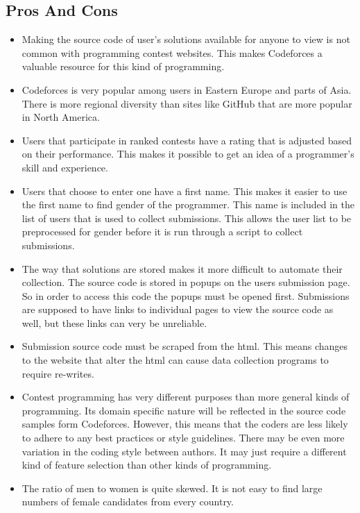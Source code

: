 \documentclass[12pt]{article}
\begin{document}
\subsection{Pros And Cons}
\begin{itemize}
    \item Making the source code of user's solutions available for anyone to view is not common with programming contest websites. This makes Codeforces a valuable resource for this kind of programming.
    
    \item Codeforces is very popular among users in Eastern Europe and parts of Asia. There is more regional diversity than sites like GitHub that are more popular in North America.
    
    \item Users that participate in ranked contests have a rating that is adjusted based on their performance. This makes it possible to get an idea of a programmer's skill and experience.
    
    \item Users that choose to enter one have a first name. This makes it easier to use the first name to find gender of the programmer. This name is included in the list of users that is used to collect submissions. This allows the user list to be preprocessed for gender before it is run through a script to collect submissions.

    \item The way that solutions are stored makes it more difficult to automate their collection. The source code is stored in popups on the users submission page. So in order to access this code the popups must be opened first. Submissions are supposed to have links to individual pages to view the source code as well, but these links can very be unreliable.

    \item Submission source code must be scraped from the html. This means changes to the website that alter the html can cause data collection programs to require re-writes.

    \item Contest programming has very different purposes than more general kinds of programming. Its domain specific nature will be reflected in the source code samples form Codeforces. However, this means that the coders are less likely to adhere to any best practices or style guidelines. There may be even more variation in the coding style between authors. It may just require a different kind of feature selection than other kinds of programming.

    \item The ratio of men to women is quite skewed. It is not easy to find large numbers of female candidates from every country.
\end{itemize}
\end{document}
